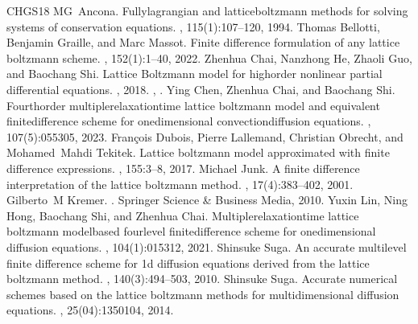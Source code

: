 \documentclass[letterpaper,10pt,english,openany,oneside]{jupyterBook}
\begin{document}
\begin{sphinxthebibliography}{CHGS18}
\sphinxAtStartPar
MG Ancona. Fully\sphinxhyphen{}lagrangian and lattice\sphinxhyphen{}boltzmann methods for solving systems of conservation equations. , 115(1):107–120, 1994.
\sphinxAtStartPar
Thomas Bellotti, Benjamin Graille, and Marc Massot. Finite difference formulation of any lattice boltzmann scheme. , 152(1):1–40, 2022.
\sphinxAtStartPar
Zhenhua Chai, Nanzhong He, Zhaoli Guo, and Baochang Shi. Lattice Boltzmann model for high\sphinxhyphen{}order nonlinear partial differential equations. , 2018. , .
\sphinxAtStartPar
Ying Chen, Zhenhua Chai, and Baochang Shi. Fourth\sphinxhyphen{}order multiple\sphinxhyphen{}relaxation\sphinxhyphen{}time lattice boltzmann model and equivalent finite\sphinxhyphen{}difference scheme for one\sphinxhyphen{}dimensional convection\sphinxhyphen{}diffusion equations. , 107(5):055305, 2023.
\sphinxAtStartPar
François Dubois, Pierre Lallemand, Christian Obrecht, and Mohamed Mahdi Tekitek. Lattice boltzmann model approximated with finite difference expressions. , 155:3–8, 2017.
\sphinxAtStartPar
Michael Junk. A finite difference interpretation of the lattice boltzmann method. , 17(4):383–402, 2001.
\sphinxAtStartPar
Gilberto M Kremer. . Springer Science \& Business Media, 2010.
\sphinxAtStartPar
Yuxin Lin, Ning Hong, Baochang Shi, and Zhenhua Chai. Multiple\sphinxhyphen{}relaxation\sphinxhyphen{}time lattice boltzmann model\sphinxhyphen{}based four\sphinxhyphen{}level finite\sphinxhyphen{}difference scheme for one\sphinxhyphen{}dimensional diffusion equations. , 104(1):015312, 2021.
\sphinxAtStartPar
Shinsuke Suga. An accurate multi\sphinxhyphen{}level finite difference scheme for 1d diffusion equations derived from the lattice boltzmann method. , 140(3):494–503, 2010.
\sphinxAtStartPar
Shinsuke Suga. Accurate numerical schemes based on the lattice boltzmann methods for multi\sphinxhyphen{}dimensional diffusion equations. , 25(04):1350104, 2014.
\end{sphinxthebibliography}







\renewcommand{\indexname}{Index}
\printindex
\end{document}
